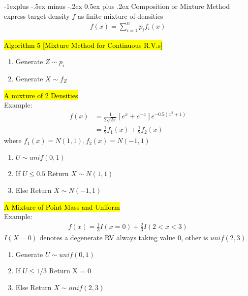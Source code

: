 \documentclass[a4paper,12pt,landscape]{article}
\makeatletter
\renewcommand{\subsection}{\@startsection{subsection}{2}{0mm}%
                                {-1explus -.5ex minus -.2ex}%
                                {0.5ex plus .2ex}%
                                {\normalfont\normalsize\bfseries\color{blue}}}
\makeatother
\begin{document}
\begin{multicols}{3}
\subsection{Composition or Mixture Method}
    express target density $f$ as finite mixture of densities
    \begin{align*}
        f(x) = \sum_{i=1}^np_if_i(x)
    \end{align*}

    \hl{Algorithm 5 [Mixture Method for Continuous R.V.s]}\\
    \begin{enumerate}
        \item Generate $Z \sim p_i$
        \item Generate $X \sim f_Z$
    \end{enumerate}
    \hl{A mixture of 2 Densities}\\
    Example:
    \begin{align*}
        f(x) &= \frac{1}{2\sqrt{2\pi}}\left[ e^x + e^{-x}  \right] e^{-0.5(x^2+1)}\\
             &= \frac{1}{2}f_1(x) + \frac{1}{2}f_2(x)
    \end{align*}
    where $f_1(x) = N(1,1), f_2(x) = N(-1,1)$
    \begin{enumerate}
        \item $U \sim unif(0,1)$
        \item If $U \leq 0.5$
            \subitem Return $X\sim N(1,1)$
        \item Else
            \subitem Return $X\sim N(-1,1)$
    \end{enumerate}

    \hl{A Mixture of Point Mass and Uniform}\\
    Example:
    \begin{align*}
        f(x) = \frac{1}{3}I(x=0) + \frac{2}{3}I(2 < x < 3)
    \end{align*}
    $I(X=0)$ denotes a degenerate RV always taking value $0$, other is $unif(2,3)$
    \begin{enumerate}
        \item Generate $U\sim unif(0,1)$
        \item If $U \leq 1/3$
            \subitem Return X = 0
        \item Else
            \subitem Return $X\sim unif(2,3)$
    \end{enumerate}


\end{multicols}
\end{document}
